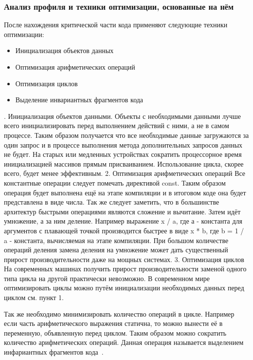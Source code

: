 \documentclass{../industrial-development}
\begin{document}
\begin{frame} \frametitle{Анализ профиля и техники оптимизации, основанные на нём}
	\begin{block}{}
		После нахождения критической части кода применяют следующие техники оптимизации:
	\end{block}
	
	\begin{itemize}
		\item Инициализация объектов данных
		\item Оптимизация арифметических операций
		\item Оптимизация циклов
		\item Выделение инвариантных фрагментов кода
	\end{itemize}
\end{frame}
. Инициализация объектов данными. Объекты с необходимыми данными лучше всего инициализировать перед выполнением действий с ними, а не в самом процессе. Таким образом получается что все необходимые данные загружаются за один запрос и в процессе выполнения метода дополнительных запросов данных не будет.
На старых или медленных устройствах сократить процессорное время инициализацией массивов прямым присваиванием. Использование цикла, скорее всего, будет менее эффективным.
2. Оптимизация арифметических операций
Все константные операции следует помечать директивой const. Таким образом операция будет выполнена ещё на этапе компиляции и в итоговом коде она будет представлена в виде числа.
Так же следует заметить, что в большинстве архитектур быстрыми операциями являются сложение и вычитание. Затем идёт умножение, а за ним деление. Например выражение x / a, где а - константа для аргументов с плавающей точкой производится быстрее в виде x * b, где b = 1 / a - константа, вычисляемая на этапе компиляции. При большом количестве операций деления замена деления на умножение может дать существенный прирост производительности даже на мощных системах.
3. Оптимизация циклов
На современных машинах получить прирост производительности заменой одного типа цикла на другой практически невозможно. В современном мире оптимизировать циклы можно путём инициализации необходимых данных перед циклом см. пункт 1.

Так же необходимо минимизировать количество операций в цикле. Например если часть арифметического выражения статична, то можно вынести её в переменную, объявленную перед циклом. Таким образом можно сократить количество арифметических операций.
Данная операция называется выделением инфариантных фрагментов кода~\cite{Optimization}.
\end{document}

